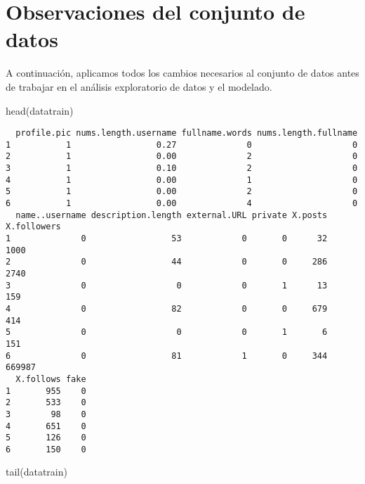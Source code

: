 \documentclass[
  letterpaper,
  DIV=11,
  numbers=noendperiod]{scrreprt}
\newenvironment{Shaded}{\begin{snugshade}}{\end{snugshade}}
\newcommand{\FunctionTok}[1]{\textcolor[rgb]{0.28,0.35,0.67}{#1}}
\newcommand{\NormalTok}[1]{\textcolor[rgb]{0.00,0.23,0.31}{#1}}
\begin{document}
\hypertarget{observaciones-del-conjunto-de-datos}{%
\section{Observaciones del conjunto de
datos}\label{observaciones-del-conjunto-de-datos}}

A continuación, aplicamos todos los cambios necesarios al conjunto de
datos antes de trabajar en el análisis exploratorio de datos y el
modelado.

\begin{Shaded}
\begin{Highlighting}[]
\FunctionTok{head}\NormalTok{(datatrain)}
\end{Highlighting}
\end{Shaded}

\begin{verbatim}
  profile.pic nums.length.username fullname.words nums.length.fullname
1           1                 0.27              0                    0
2           1                 0.00              2                    0
3           1                 0.10              2                    0
4           1                 0.00              1                    0
5           1                 0.00              2                    0
6           1                 0.00              4                    0
  name..username description.length external.URL private X.posts X.followers
1              0                 53            0       0      32        1000
2              0                 44            0       0     286        2740
3              0                  0            0       1      13         159
4              0                 82            0       0     679         414
5              0                  0            0       1       6         151
6              0                 81            1       0     344      669987
  X.follows fake
1       955    0
2       533    0
3        98    0
4       651    0
5       126    0
6       150    0
\end{verbatim}

\begin{Shaded}
\begin{Highlighting}[]
\FunctionTok{tail}\NormalTok{(datatrain)}
\end{Highlighting}
\end{Shaded}
\end{document}
